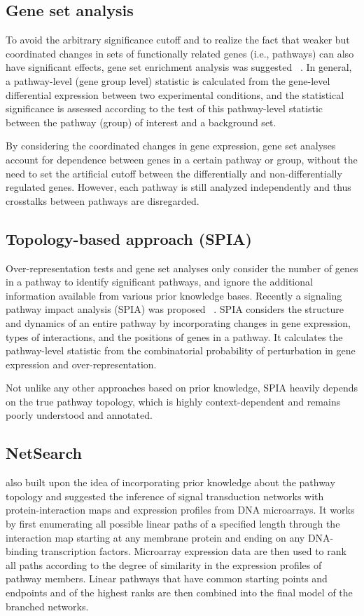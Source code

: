 \subsection{Gene set analysis}
To avoid the arbitrary significance cutoff and to realize the fact that weaker 
but coordinated changes in sets of functionally related genes (i.e., pathways) 
can also have significant effects, gene set enrichment analysis was suggested~%
\citep{Subramanian2005,Luo2009}. In general,
a pathway-level (gene group level) statistic is calculated from the gene-level 
differential expression between two experimental conditions, and the 
statistical significance is assessed according to the test of
this pathway-level statistic between the pathway (group) of interest and a 
background set.

By considering the coordinated changes in gene expression, gene set analyses 
account for dependence between genes in a certain pathway or group, without
the need to set the artificial cutoff between the differentially and 
non-differentially regulated genes. However,
each pathway is still analyzed independently and thus crosstalks between
pathways are disregarded.

\subsection{Topology-based approach (SPIA)}
Over-representation tests and gene set analyses only consider the number of genes 
in a pathway to identify significant pathways, and ignore the additional 
information available from various prior knowledge bases. Recently a signaling
pathway impact analysis (SPIA) was proposed~%
\citep{Tarca2009}. SPIA considers the structure and dynamics of an entire 
pathway by incorporating changes in gene expression, types of interactions, 
and the positions of genes in a pathway. 
It calculates the pathway-level statistic from the combinatorial probability 
of perturbation in gene expression and over-representation. 

Not unlike any other approaches based on prior knowledge,
SPIA heavily depends on the true pathway topology, which is highly
context-dependent and remains poorly understood and annotated.

\subsection{NetSearch}
\cite{Steffen2002} also built upon the idea of incorporating 
prior knowledge about the pathway topology and suggested
the inference of signal transduction networks with protein-interaction maps
and expression profiles from DNA microarrays.
It works by first enumerating all possible linear paths
of a specified length through the interaction map starting
at any membrane protein and ending on any DNA-binding
transcription factors.
Microarray expression data are then used
to rank all paths according to the degree of similarity in
the expression profiles of pathway members.
Linear pathways
that have common starting points and endpoints
and of the highest ranks are then combined into the final
model of the branched networks.

